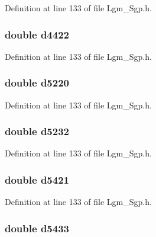 Definition at line 133 of file Lgm\_\-Sgp.h.\hypertarget{struct___sgp_info_71ff139b8068f058073bd65be4a038a4}{
\subsubsection[{d4422}]{\setlength{\rightskip}{0pt plus 5cm}double {\bf d4422}}}
\label{struct___sgp_info_71ff139b8068f058073bd65be4a038a4}




Definition at line 133 of file Lgm\_\-Sgp.h.\hypertarget{struct___sgp_info_bdd287076f628dd8963e31918c477f27}{
\subsubsection[{d5220}]{\setlength{\rightskip}{0pt plus 5cm}double {\bf d5220}}}
\label{struct___sgp_info_bdd287076f628dd8963e31918c477f27}




Definition at line 133 of file Lgm\_\-Sgp.h.\hypertarget{struct___sgp_info_6029959a3ce7b1deec5862dab9dc928b}{
\subsubsection[{d5232}]{\setlength{\rightskip}{0pt plus 5cm}double {\bf d5232}}}
\label{struct___sgp_info_6029959a3ce7b1deec5862dab9dc928b}




Definition at line 133 of file Lgm\_\-Sgp.h.\hypertarget{struct___sgp_info_27382a4e06e4d963a2e268a4e47eb639}{
\subsubsection[{d5421}]{\setlength{\rightskip}{0pt plus 5cm}double {\bf d5421}}}
\label{struct___sgp_info_27382a4e06e4d963a2e268a4e47eb639}




Definition at line 133 of file Lgm\_\-Sgp.h.\hypertarget{struct___sgp_info_ed583d24183bddfa0eb67ca6653c9a42}{
\subsubsection[{d5433}]{\setlength{\rightskip}{0pt plus 5cm}double {\bf d5433}}}
\label{struct___sgp_info_ed583d24183bddfa0eb67ca6653c9a42}





